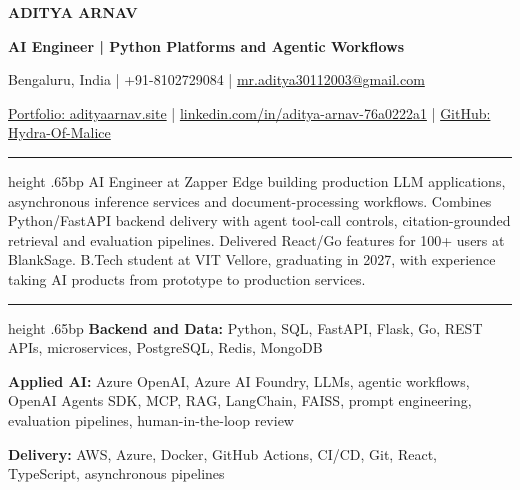 \documentclass[10pt]{article}
\newcommand{\resumesection}[1]{\par\vspace{8bp}{\fontsize{11bp}{13bp}\selectfont\bfseries #1\par}\vspace{3bp}\hrule height .65bp\vspace{4bp}}
\begin{document}
\fontsize{10.25bp}{12.4bp}\selectfont
{\centering
{\fontsize{19bp}{22bp}\selectfont\bfseries ADITYA ARNAV\par}
\vspace{1bp}
{\fontsize{10.8bp}{13bp}\selectfont\bfseries AI Engineer | Python Platforms and Agentic Workflows\par}
\vspace{2bp}
{\fontsize{9bp}{11bp}\selectfont Bengaluru, India | +91-8102729084 | \href{mailto:mr.aditya30112003@gmail.com}{mr.aditya30112003@gmail.com}\par}
{\fontsize{9bp}{11bp}\selectfont \href{https://www.adityaarnav.site/}{Portfolio: adityaarnav.site} | \href{https://www.linkedin.com/in/aditya-arnav-76a0222a1}{linkedin.com/in/aditya-arnav-76a0222a1} | \href{https://github.com/Hydra-Of-Malice}{GitHub: Hydra-Of-Malice}\par}}

\resumesection{SUMMARY}
AI Engineer at Zapper Edge building production LLM applications, asynchronous inference services and document-processing workflows. Combines Python/FastAPI backend delivery with agent tool-call controls, citation-grounded retrieval and evaluation pipelines. Delivered React/Go features for 100+ users at BlankSage. B.Tech student at VIT Vellore, graduating in 2027, with experience taking AI products from prototype to production services.

\resumesection{TECHNICAL SKILLS}
\textbf{Backend and Data:} Python, SQL, FastAPI, Flask, Go, REST APIs, microservices, PostgreSQL, Redis, MongoDB\par
\textbf{Applied AI:} Azure OpenAI, Azure AI Foundry, LLMs, agentic workflows, OpenAI Agents SDK, MCP, RAG, LangChain, FAISS, prompt engineering, evaluation pipelines, human-in-the-loop review\par
\textbf{Delivery:} AWS, Azure, Docker, GitHub Actions, CI/CD, Git, React, TypeScript, asynchronous pipelines
\end{document}
